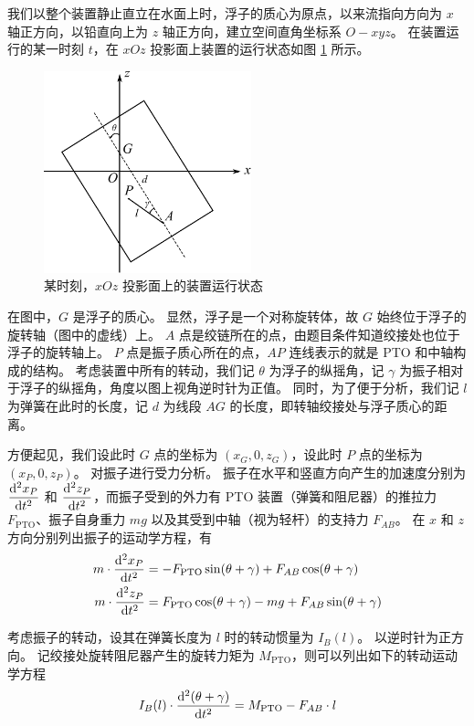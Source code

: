 我们以整个装置静止直立在水面上时，浮子的质心为原点，以来流指向方向为 $x$ 轴正方向，以铅直向上为 $z$ 轴正方向，建立空间直角坐标系 $O-xyz$。
在装置运行的某一时刻 $t$，在 $xOz$ 投影面上装置的运行状态如图 \ref{status} 所示。
\begin{figure}[htbp]
    \centering
    \includegraphics[width=6cm]{fig/problem-3-1.pdf}
    \caption{某时刻，$xOz$ 投影面上的装置运行状态}
    \label{status}
\end{figure}

在图中，$G$ 是浮子的质心。
显然，浮子是一个对称旋转体，故 $G$ 始终位于浮子的旋转轴（图中的虚线）上。
$A$ 点是绞链所在的点，由题目条件知道绞接处也位于浮子的旋转轴上。
$P$ 点是振子质心所在的点，$AP$ 连线表示的就是 PTO 和中轴构成的结构。
考虑装置中所有的转动，我们记 $\theta$ 为浮子的纵摇角，记 $\gamma$ 为振子相对于浮子的纵摇角，角度以图上视角逆时针为正值。
同时，为了便于分析，我们记 $l$ 为弹簧在此时的长度，记 $d$ 为线段 $AG$ 的长度，即转轴绞接处与浮子质心的距离。

方便起见，我们设此时 $G$ 点的坐标为 $(x_G, 0, z_G)$，设此时 $P$ 点的坐标为 $(x_P, 0, z_P)$。
对振子进行受力分析。
振子在水平和竖直方向产生的加速度分别为 $\dfrac{\mathop{}\!\mathrm{d}^2 x_P}{\mathop{}\!\mathrm{d} t^2}$ 和 $\dfrac{\mathop{}\!\mathrm{d}^2 z_P}{\mathop{}\!\mathrm{d} t^2}$，而振子受到的外力有 PTO 装置（弹簧和阻尼器）的推拉力 $F_\text{PTO}$、振子自身重力 $mg$ 以及其受到中轴（视为轻杆）的支持力 $F_{AB}$。
在 $x$ 和 $z$ 方向分别列出振子的运动学方程，有
\begin{align}
    m\cdot\dfrac{\mathop{}\!\mathrm{d}^2 x_P}{\mathop{}\!\mathrm{d} t^2} &= -F_\text{PTO}\sin(\theta+\gamma)+F_{AB}\cos(\theta+\gamma) \label{problem-3-eq1}\\
    m\cdot\dfrac{\mathop{}\!\mathrm{d}^2 z_P}{\mathop{}\!\mathrm{d} t^2} &= F_\text{PTO}\cos(\theta+\gamma)-mg+F_{AB}\sin(\theta+\gamma)
\end{align}

考虑振子的转动，设其在弹簧长度为 $l$ 时的转动惯量为 $I_B(l)$。
以逆时针为正方向。
记绞接处旋转阻尼器产生的旋转力矩为 $M_\text{PTO}$，则可以列出如下的转动运动学方程
\begin{equation}
    I_B(l)\cdot\dfrac{\mathop{}\!\mathrm{d}^2(\theta+\gamma)}{\mathop{}\!\mathrm{d} t^2}=M_\text{PTO}-F_{AB}\cdot l
\end{equation}

